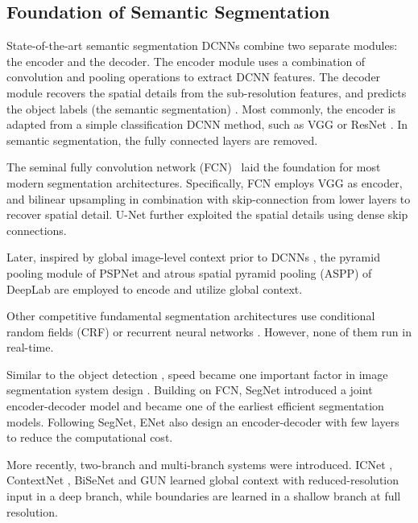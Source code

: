 \documentclass[10pt,twocolumn,letterpaper]{article}
\begin{document}
\subsection{Foundation of Semantic Segmentation}

State-of-the-art semantic segmentation DCNNs combine two separate modules: the encoder and the decoder. The encoder module uses a combination of convolution and pooling operations to extract DCNN features. The decoder module recovers the spatial details from the sub-resolution features, and predicts the object labels (\ie the semantic segmentation) \cite{fcn-long2016,segnet-badrinarayanan2017}. Most commonly, the encoder is adapted from a simple classification DCNN method, such as VGG \cite{vgg-simonyan2014} or ResNet \cite{resnet-he2015}. In semantic segmentation, the fully connected layers are removed.

The seminal fully convolution network (FCN)~\cite{fcn-long2016} laid the foundation for most modern segmentation architectures. Specifically, FCN employs VGG \cite{vgg-simonyan2014} as encoder, and bilinear upsampling in combination with skip-connection from lower layers to recover spatial detail. U-Net \cite{u-net-ronneberger2015} further exploited the spatial details using dense skip connections.

Later, inspired by global image-level context prior to DCNNs \cite{lazebnik2006,lucchi2011}, the pyramid pooling module of PSPNet \cite{pspnet-zhao2017a} and atrous spatial pyramid pooling (ASPP) of DeepLab \cite{deeplab-v2-chen2016} are employed to encode and utilize global context.

Other competitive fundamental segmentation architectures use conditional random fields (CRF) \cite{zheng2015,chen2014} or recurrent neural networks \cite{visin2015,zheng2015}. However, none of them run in real-time.

Similar to the object detection \cite{yolo-redmon2016,yolo9000-redmon2016,ssd-liu2015}, speed became one important factor in image segmentation system design \cite{contextnet-poudel2018,BiSeNet-yu2018,gun-mazzini2018,erfnet-romera2018,icnet-zhao2017b,enet-paszke2016}. Building on FCN, SegNet \cite{segnet-badrinarayanan2017} introduced a joint encoder-decoder model and became one of the earliest efficient segmentation models. Following SegNet, ENet \cite{enet-paszke2016} also design an encoder-decoder with few layers to reduce the computational cost.

More recently, two-branch and multi-branch systems were introduced. ICNet \cite{icnet-zhao2017b}, ContextNet \cite{contextnet-poudel2018}, BiSeNet \cite{BiSeNet-yu2018} and GUN \cite{gun-mazzini2018} learned global context with reduced-resolution input in a deep branch, while boundaries are learned in a shallow branch at full resolution.
\end{document}
